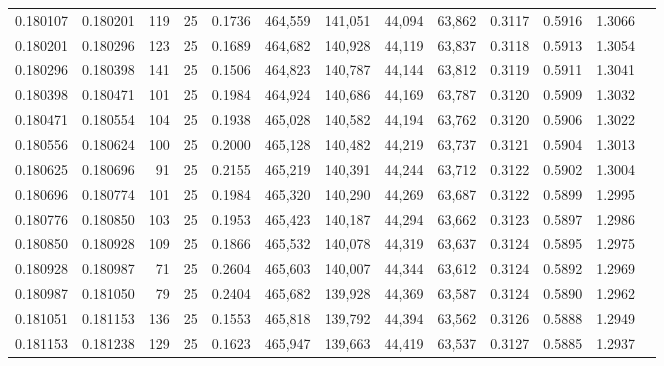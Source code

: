 \begin{tabular}{rrrrrrrrrrrrr}
0.180107 & 0.180201 &   119 &  25 &                                     0.1736 & 464,559 & 141,051 &  44,094 &  63,862 & 0.3117 & 0.5916 & 1.3066 \\
0.180201 & 0.180296 &   123 &  25 &                                     0.1689 & 464,682 & 140,928 &  44,119 &  63,837 & 0.3118 & 0.5913 & 1.3054 \\
0.180296 & 0.180398 &   141 &  25 &                                     0.1506 & 464,823 & 140,787 &  44,144 &  63,812 & 0.3119 & 0.5911 & 1.3041 \\
0.180398 & 0.180471 &   101 &  25 &                                     0.1984 & 464,924 & 140,686 &  44,169 &  63,787 & 0.3120 & 0.5909 & 1.3032 \\
0.180471 & 0.180554 &   104 &  25 &                                     0.1938 & 465,028 & 140,582 &  44,194 &  63,762 & 0.3120 & 0.5906 & 1.3022 \\
0.180556 & 0.180624 &   100 &  25 &                                     0.2000 & 465,128 & 140,482 &  44,219 &  63,737 & 0.3121 & 0.5904 & 1.3013 \\
0.180625 & 0.180696 &    91 &  25 &                                     0.2155 & 465,219 & 140,391 &  44,244 &  63,712 & 0.3122 & 0.5902 & 1.3004 \\
0.180696 & 0.180774 &   101 &  25 &                                     0.1984 & 465,320 & 140,290 &  44,269 &  63,687 & 0.3122 & 0.5899 & 1.2995 \\
0.180776 & 0.180850 &   103 &  25 &                                     0.1953 & 465,423 & 140,187 &  44,294 &  63,662 & 0.3123 & 0.5897 & 1.2986 \\
0.180850 & 0.180928 &   109 &  25 &                                     0.1866 & 465,532 & 140,078 &  44,319 &  63,637 & 0.3124 & 0.5895 & 1.2975 \\
0.180928 & 0.180987 &    71 &  25 &                                     0.2604 & 465,603 & 140,007 &  44,344 &  63,612 & 0.3124 & 0.5892 & 1.2969 \\
0.180987 & 0.181050 &    79 &  25 &                                     0.2404 & 465,682 & 139,928 &  44,369 &  63,587 & 0.3124 & 0.5890 & 1.2962 \\
0.181051 & 0.181153 &   136 &  25 &                                     0.1553 & 465,818 & 139,792 &  44,394 &  63,562 & 0.3126 & 0.5888 & 1.2949 \\
0.181153 & 0.181238 &   129 &  25 &                                     0.1623 & 465,947 & 139,663 &  44,419 &  63,537 & 0.3127 & 0.5885 & 1.2937 \\

\end{tabular}

